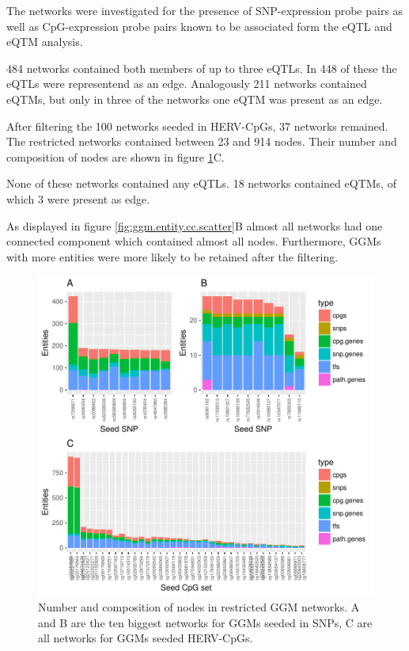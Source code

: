 \documentclass[a4paper,12pt,twoside,openright]{article}
\begin{document}
The networks were investigated for the presence of SNP-expression probe pairs as well as CpG-expression probe pairs known to be associated form the eQTL and eQTM analysis. 

484 networks contained both members of up to three eQTLs. In 448 of these the eQTLs were representend as an edge. Analogously 211 networks contained eQTMs, but only in three of the networks one eQTM was present as an edge. 

After filtering the 100 networks seeded in HERV-CpGs, 37 networks remained. The restricted networks contained between 23 and 914 nodes. Their number and composition of nodes are shown in figure \ref{fig:ggm.cc.nodes.bar}C. 

None of these networks contained any eQTLs. 18 networks contained eQTMs, of which 3 were present as edge. 

As displayed in figure \ref{fig:ggm.entity.cc.scatter}B almost all networks had one connected component which contained almost all nodes. Furthermore, GGMs with more entities were more likely to be retained after the filtering. 

\begin{figure}[tb]
	\includegraphics[scale = 1, keepaspectratio = true]{../figures/hervS2_ggm_cc_nodes_bar}  
	\caption{Number and composition of nodes in restricted GGM networks. A and B are the ten biggest networks for GGMs seeded in SNPs, C are all networks for GGMs seeded HERV-CpGs.}
    \label{fig:ggm.cc.nodes.bar}
\end{figure}
\end{document}
